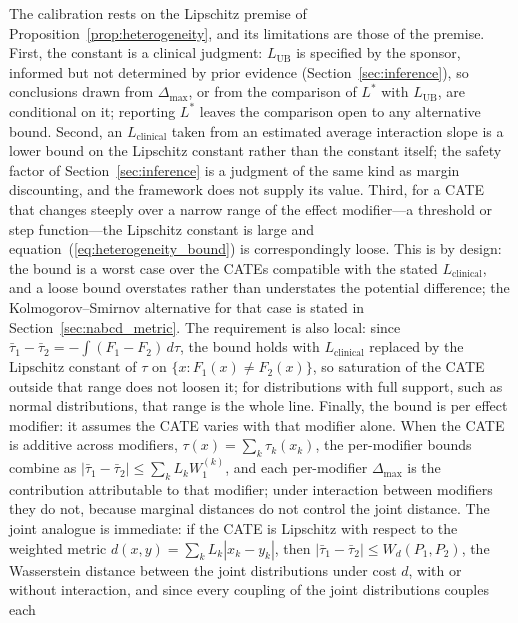 \documentclass[AMA,Times1COL]{WileyNJDv5}
\begin{document}
The calibration rests on the Lipschitz premise of Proposition~\ref{prop:heterogeneity}, and its limitations are those of the premise. First, the constant is a clinical judgment: $L_{\text{UB}}$ is specified by the sponsor, informed but not determined by prior evidence (Section~\ref{sec:inference}), so conclusions drawn from $\Delta_{\max}$, or from the comparison of $L^*$ with $L_{\text{UB}}$, are conditional on it; reporting $L^*$ leaves the comparison open to any alternative bound. Second, an $L_{\text{clinical}}$ taken from an estimated average interaction slope is a lower bound on the Lipschitz constant rather than the constant itself; the safety factor of Section~\ref{sec:inference} is a judgment of the same kind as margin discounting, and the framework does not supply its value. Third, for a CATE that changes steeply over a narrow range of the effect modifier---a threshold or step function---the Lipschitz constant is large and equation~(\ref{eq:heterogeneity_bound}) is correspondingly loose. This is by design: the bound is a worst case over the CATEs compatible with the stated $L_{\text{clinical}}$, and a loose bound overstates rather than understates the potential difference; the Kolmogorov--Smirnov alternative for that case is stated in Section~\ref{sec:nabcd_metric}. The requirement is also local: since $\bar{\tau}_1 - \bar{\tau}_2 = -\int (F_1 - F_2)\,d\tau$, the bound holds with $L_{\text{clinical}}$ replaced by the Lipschitz constant of $\tau$ on $\{x : F_1(x) \neq F_2(x)\}$, so saturation of the CATE outside that range does not loosen it; for distributions with full support, such as normal distributions, that range is the whole line. Finally, the bound is per effect modifier: it assumes the CATE varies with that modifier alone. When the CATE is additive across modifiers, $\tau(x) = \sum_k \tau_k(x_k)$, the per-modifier bounds combine as $|\bar{\tau}_1 - \bar{\tau}_2| \leq \sum_k L_k W_1^{(k)}$, and each per-modifier $\Delta_{\max}$ is the contribution attributable to that modifier; under interaction between modifiers they do not, because marginal distances do not control the joint distance. The joint analogue is immediate: if the CATE is Lipschitz with respect to the weighted metric $d(x, y) = \sum_k L_k |x_k - y_k|$, then $|\bar{\tau}_1 - \bar{\tau}_2| \leq W_d(P_1, P_2)$, the Wasserstein distance between the joint distributions under cost $d$, with or without interaction, and since every coupling of the joint distributions couples each 
\end{document}
